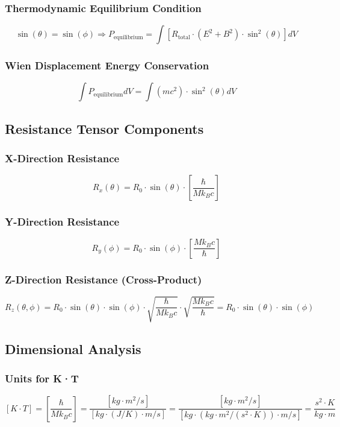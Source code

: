 ﻿\documentclass[12pt]{article}
\begin{document}
\subsubsection{Thermodynamic Equilibrium Condition}
$$\sin(\theta) = \sin(\phi) \Rightarrow P_{\text{equilibrium}} = \int\left[R_{\text{total}}\cdot(E^2 + B^2)\cdot\sin^2(\theta)\right]dV$$

\subsubsection{Wien Displacement Energy Conservation}
$$\int P_{\text{equilibrium}} dV = \int(mc^2)\cdot\sin^2(\theta)dV$$

\subsection{Resistance Tensor Components}

\subsubsection{X-Direction Resistance}
$$R_x(\theta) = R_0\cdot\sin(\theta)\cdot\left[\frac{\hbar}{Mk_Bc}\right]$$

\subsubsection{Y-Direction Resistance}
$$R_y(\phi) = R_0\cdot\sin(\phi)\cdot\left[\frac{Mk_Bc}{\hbar}\right]$$

\subsubsection{Z-Direction Resistance (Cross-Product)}
$$R_z(\theta,\phi) = R_0\cdot\sin(\theta)\cdot\sin(\phi)\cdot\sqrt{\frac{\hbar}{Mk_Bc}}\cdot\sqrt{\frac{Mk_Bc}{\hbar}} = R_0\cdot\sin(\theta)\cdot\sin(\phi)$$

\subsection{Dimensional Analysis}

\subsubsection{Units for K·T}
$$[K \cdot T] = \left[\frac{\hbar}{Mk_Bc}\right] = \frac{[kg \cdot m^2/s]}{[kg \cdot (J/K) \cdot m/s]} = \frac{[kg \cdot m^2/s]}{[kg \cdot (kg \cdot m^2/(s^2 \cdot K)) \cdot m/s]} = \frac{s^2 \cdot K}{kg \cdot m}$$
\end{document}
